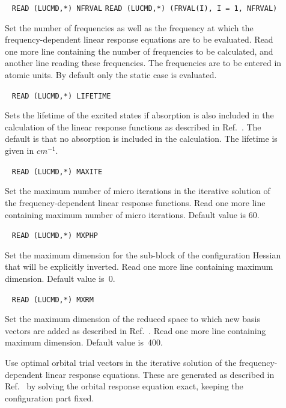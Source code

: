 \begin{description}
\item[]\verb| |\newline
\verb|READ (LUCMD,*) NFRVAL|\newline
\verb|READ (LUCMD,*) (FRVAL(I), I = 1, NFRVAL)|

Set the number of frequencies as well as the frequency at which the
frequency-dependent linear response equations are to be evaluated.
Read one more line containing the number of frequencies to be
calculated, and another line reading these frequencies. The
frequencies are to be entered in atomic units. By default only the
static case is evaluated.

\item[]\verb| |\newline
\verb|READ (LUCMD,*) LIFETIME|

Sets the lifetime of the excited states if absorption is also included
in the calculation of the linear response functions as described in
Ref.~\cite{pndmbhjajjojcp115,pnkrthjcp120}. The default is that no
absorption is included in the calculation. The lifetime is given in
$cm^{-1}$. 

\item[]\verb| |\newline
\verb|READ (LUCMD,*) MAXITE|

Set the maximum number of micro iterations in the iterative solution of
the frequency-dependent linear response functions. Read one more line
containing maximum number of micro iterations. Default value is
60.

\item[]\verb| |\newline
\verb|READ (LUCMD,*) MXPHP|

Set the maximum dimension for the sub-block of the configuration
Hessian that will be explicitly inverted. Read one more line
containing maximum dimension. Default value is~0.

\item[]\verb| |\newline
\verb|READ (LUCMD,*) MXRM|

Set the maximum dimension of the reduced space to which new basis
vectors are added as described in Ref.~\cite{tuhjahjajpjjcp84}. Read
one more line containing maximum dimension. Default value is~400.

\item[] Use optimal orbital trial vectors in the 
iterative solution of the frequency-depen\-dent linear
response
equations. These are generated as described in
Ref.~\cite{tuhjahjajpjjcp84} by solving the orbital response equation
exact, keeping the configuration part fixed.


\end{description}
